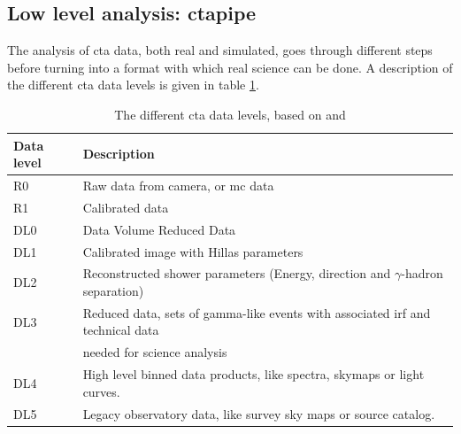 \documentclass[main.tex]{subfiles}
\begin{document}
\subsection{Low level analysis: ctapipe} \label{sec:ctapipe}
The analysis of \gls{cta} data, both real and simulated, goes through different steps before turning into a format with which real science can be done. A description of the different \gls{cta} data levels is given in table \ref{tab:CTAdatalevels}. 
\begin{table}
  \centering
  \begin{tabular}{|l|l|}
    \hline
    Data level & Description \\
    \hline
    R0 & Raw data from camera, or \gls{mc} data\\
    R1 & Calibrated data \\
    DL0 & Data Volume Reduced Data \\
    DL1 & Calibrated image with Hillas parameters \\
    DL2 & Reconstructed shower parameters (Energy, direction and $\gamma$-hadron separation) \\
    DL3 & Reduced data, sets of gamma-like events with associated \gls{irf} and technical data\\
    & needed for science analysis \\
    DL4 & High level binned data products, like spectra, skymaps or light curves.\\
    DL5 & Legacy observatory data, like survey sky maps or source catalog. \\
    \hline
  \end{tabular}
  \caption{The different \gls{cta} data levels, based on \cite{ctapipe} and \cite{2015CTAdata}}
  \label{tab:CTAdatalevels}
\end{table}
\end{document}
